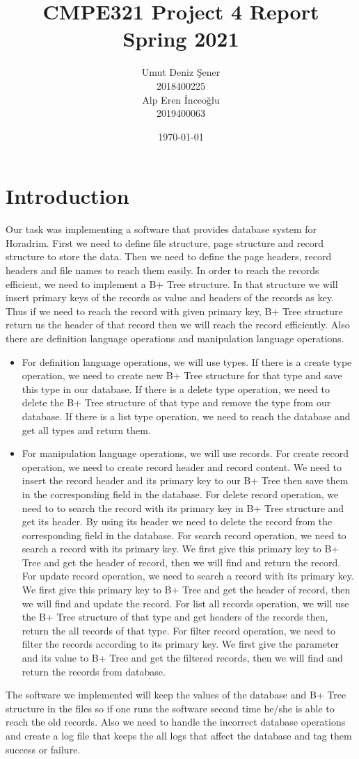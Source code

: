 \documentclass{article}
\title{CMPE321 Project 4 Report \\Spring 2021}
\date{\today}
\author{Umut Deniz Şener  \\ 2018400225 \\ Alp Eren İnceoğlu \\ 2019400063 }
\begin{document}
\maketitle
\newpage
\tableofcontents
\newpage
\section{Introduction}
\label{sec:introduction}
Our task was implementing a software that provides database system for Horadrim. First we need to define file structure, page structure and record structure to store the data. Then we need to define the page headers, record headers and file names to reach them easily. In order to reach the records efficient, we need to implement a B+ Tree structure. In that structure we will insert primary keys of the records as value and headers of the records as key. Thus if we need to reach the record with given primary key, B+ Tree structure return us the header of that record then we will reach the record efficiently. Also there are definition language operations and manipulation language operations. 
\begin{itemize}
    \item For definition language operations, we will use types. If there is a create type operation, we need to create new B+ Tree structure for that type and save this type in our database. If there is a delete type operation, we need to delete the B+ Tree structure of that type and remove the type from our database. If there is a list type operation, we need to reach the database and get all types and return them. 
    \item For manipulation language operations, we will use records. For create record operation, we need to create record header and record content. We need to insert the record header and its primary key to our B+ Tree then save them in the corresponding field in the database.  For delete record operation, we need to to search the record with its primary key in B+ Tree structure and get its header. By using its header we need to delete the record from the corresponding field in the database. For search record operation, we need to search a record with its primary key. We first give this primary key to B+ Tree and get the header of record, then we will find and return the record. For update record operation, we need to search a record with its primary key. We first give this primary key to B+ Tree and get the header of record, then we will find and update the record. For list all records operation, we will use the B+ Tree structure of that type and get headers of the records then, return the all records of that type. For filter record operation, we need to filter the records according to its primary key. We first give the parameter and its value to B+ Tree and get the filtered records, then we will find and return the records from database. 
\end{itemize}
The software we implemented will keep the values of the database and B+ Tree structure in the files so if one runs the software second time he/she is able to reach the old records. Also we need to handle the incorrect database operations and create a log file that keeps the all logs that affect the database and tag them success or failure. 
\end{document}
